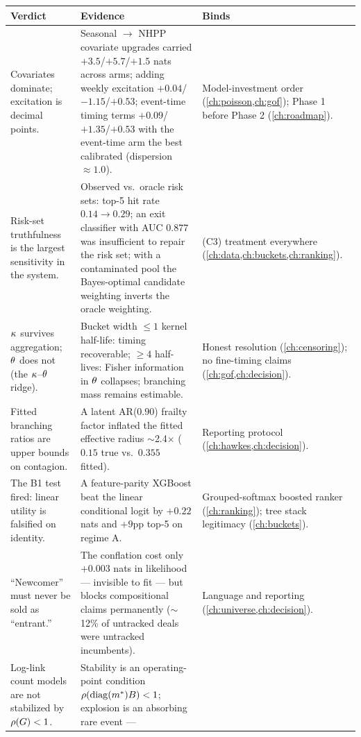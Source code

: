 \begin{longtable}{p{} p{} p{}}
\toprule
\textbf{Verdict} & \textbf{Evidence} & \textbf{Binds} \\
\midrule
\endhead
Covariates dominate; excitation is decimal points. & Seasonal
$\to$ NHPP covariate upgrades carried $+3.5$/$+5.7$/$+1.5$ nats across
arms; adding weekly excitation $+0.04$/$-1.15$/$+0.53$; event-time
timing terms $+0.09$/$+1.35$/$+0.53$ with the event-time arm the best
calibrated (dispersion $\approx 1.0$). & Model-investment order
(\cref{ch:poisson,ch:gof}); Phase 1 before Phase 2
(\cref{ch:roadmap}). \\
\addlinespace
Risk-set truthfulness is the largest sensitivity in the system. &
Observed vs.\ oracle risk sets: top-5 hit rate $0.14 \to 0.29$; an exit
classifier with AUC $0.877$ was insufficient to repair the risk set;
with a contaminated pool the Bayes-optimal candidate weighting inverts
the oracle weighting. & (C3) treatment everywhere
(\cref{ch:data,ch:buckets,ch:ranking}). \\
\addlinespace
$\kappa$ survives aggregation; $\theta$ does not (the
$\kappa$--$\theta$ ridge). & Bucket width $\le 1$ kernel half-life:
timing recoverable; $\ge 4$ half-lives: Fisher information in
$\theta$ collapses; branching mass remains estimable. & Honest
resolution (\cref{ch:censoring}); no fine-timing claims
(\cref{ch:gof,ch:decision}). \\
\addlinespace
Fitted branching ratios are upper bounds on contagion. & A latent
AR($0.90$) frailty factor inflated the fitted effective radius
$\sim$2.4$\times$ ($0.15$ true vs.\ $0.355$ fitted). & Reporting
protocol (\cref{ch:hawkes,ch:decision}). \\
\addlinespace
The B1 test fired: linear utility is falsified on identity. & A
feature-parity XGBoost beat the linear conditional logit by $+0.22$
nats and $+9$pp top-5 on regime A. & Grouped-softmax boosted ranker
(\cref{ch:ranking}); tree stack legitimacy (\cref{ch:buckets}). \\
\addlinespace
``Newcomer'' must never be sold as ``entrant.'' & The conflation cost
only $+0.003$ nats in likelihood --- invisible to fit --- but blocks
compositional claims permanently ($\sim$12\% of untracked deals were
untracked incumbents). & Language and reporting
(\cref{ch:universe,ch:decision}). \\
\addlinespace
Log-link count models are not stabilized by $\rho\!\left(G\right)<1$. &
Stability is an operating-point condition
$\rho\!\left(\operatorname{diag}(m^{*})B\right)<1$; explosion is an absorbing rare event ---

\end{longtable}
